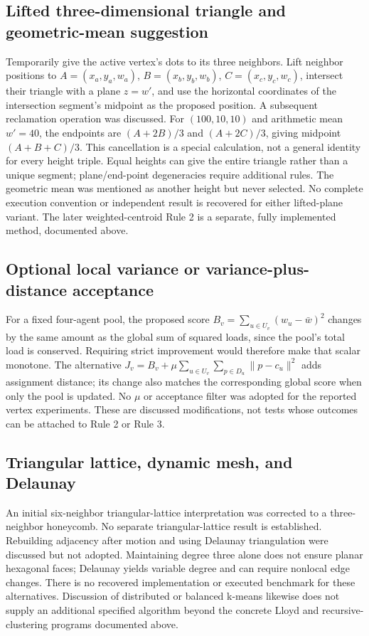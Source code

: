 \documentclass[11pt]{article}
\begin{document}
\subsection{Lifted three-dimensional triangle and geometric-mean suggestion}
Temporarily give the active vertex's dots to its three neighbors. Lift neighbor
positions to $A=(x_a,y_a,w_a)$, $B=(x_b,y_b,w_b)$, $C=(x_c,y_c,w_c)$, intersect
their triangle with a plane $z=w'$, and use the horizontal coordinates of the
intersection segment's midpoint as the proposed position. A subsequent
reclamation operation was discussed. For $(100,10,10)$ and arithmetic mean
$w'=40$, the endpoints are $(A+2B)/3$ and $(A+2C)/3$, giving midpoint
$(A+B+C)/3$. This cancellation is a special calculation, not a general identity
for every height triple. Equal heights can give the entire triangle rather
than a unique segment; plane/end-point degeneracies require additional rules.
The geometric mean was mentioned as another height but never selected.
No complete execution convention or independent result is recovered for either
lifted-plane variant. The later weighted-centroid Rule 2 is a separate,
fully implemented method, documented above.

\subsection{Optional local variance or variance-plus-distance acceptance}
For a fixed four-agent pool, the proposed score
$B_v=\sum_{u\in U_v}(w_u-\bar w)^2$ changes by the same amount as the global
sum of squared loads, since the pool's total load is conserved. Requiring strict
improvement would therefore make that scalar monotone. The alternative
$J_v=B_v+\mu\sum_{u\in U_v}\sum_{p\in D_u}\|p-c_u\|^2$ adds assignment distance;
its change also matches the corresponding global score when only the pool is
updated. No $\mu$ or acceptance filter was adopted for the reported vertex
experiments. These are discussed modifications, not tests whose outcomes can
be attached to Rule 2 or Rule 3.

\subsection{Triangular lattice, dynamic mesh, and Delaunay}
An initial six-neighbor triangular-lattice interpretation was corrected to a
three-neighbor honeycomb. No separate triangular-lattice result is established.
Rebuilding adjacency after motion and using Delaunay triangulation were discussed
but not adopted. Maintaining degree three alone does not ensure planar
hexagonal faces; Delaunay yields variable degree and can require nonlocal edge
changes. There is no recovered implementation or executed benchmark for these
alternatives. Discussion of distributed or balanced k-means likewise does not
supply an additional specified algorithm beyond the concrete Lloyd and
recursive-clustering programs documented above.
\end{document}
